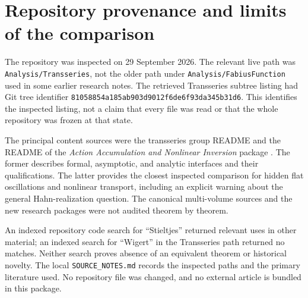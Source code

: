 \documentclass[11pt,a4paper]{article}
\numberwithin{equation}{section}
\theoremstyle{definition}
\theoremstyle{remark}
\begin{document}
\section{Repository provenance and limits of the comparison}
\label{app:provenance}
The repository was inspected on 29 September 2026. The relevant live
path was \texttt{Analysis/Transseries}, not the older path under
\texttt{Analysis/FabiusFunction} used in some earlier research notes.
The retrieved Transseries subtree listing had Git tree identifier
\texttt{81058854a185ab903d9012f6de6f93da345b31d6}.
This identifies the inspected listing, not a claim that every file was
read or that the whole repository was frozen at that state.

The principal content sources were the transseries group README and
the README of the \emph{Action Accumulation and Nonlinear Inversion}
package \cite{repo-series,repo-action}. The former describes formal,
asymptotic, and analytic interfaces and their qualifications. The latter
provides the closest inspected comparison for hidden flat oscillations
and nonlinear transport, including an explicit warning about the general
Hahn-realization question. The canonical multi-volume sources and the
new research packages were not audited theorem by theorem.

An indexed repository code search for ``Stieltjes'' returned relevant
uses in other material; an indexed search for ``Wigert'' in the
Transseries path returned no matches. Neither search proves absence of
an equivalent theorem or historical novelty. The local
\texttt{SOURCE\_NOTES.md} records the inspected paths and the primary
literature used. No repository file was changed, and no external article is bundled in
this package.
\end{document}
